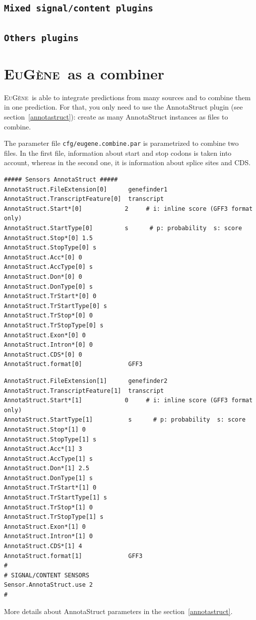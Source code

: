 \documentclass[a4paper,titlepage]{report}
\newcommand{\EuGene}{\textsc{EuG\`ene}}
\begin{document}
\subsection{\texttt{Mixed signal/content plugins}}




\subsection{\texttt{Others plugins}}





\section{\EuGene\ as a combiner}

\EuGene\ is able to integrate predictions from many sources and to combine them in one prediction.
For that, you only need to use the AnnotaStruct plugin (see section~\ref{annotastruct}): create as many AnnotaStruct instances as files to combine.


The parameter file \texttt{cfg/eugene.combine.par} is parametrized to combine two files. 
In the first file, information about start and stop codons is taken into account, whereas in the second one, it is information about splice sites and CDS.
\begin{Verbatim}[fontsize=\small]
 ##### Sensors AnnotaStruct #####
AnnotaStruct.FileExtension[0]      genefinder1
AnnotaStruct.TranscriptFeature[0]  transcript
AnnotaStruct.Start*[0]            2     # i: inline score (GFF3 format only) 
AnnotaStruct.StartType[0]         s      # p: probability  s: score
AnnotaStruct.Stop*[0] 1.5
AnnotaStruct.StopType[0] s
AnnotaStruct.Acc*[0] 0
AnnotaStruct.AccType[0] s
AnnotaStruct.Don*[0] 0
AnnotaStruct.DonType[0] s
AnnotaStruct.TrStart*[0] 0
AnnotaStruct.TrStartType[0] s
AnnotaStruct.TrStop*[0] 0
AnnotaStruct.TrStopType[0] s
AnnotaStruct.Exon*[0] 0
AnnotaStruct.Intron*[0] 0
AnnotaStruct.CDS*[0] 0
AnnotaStruct.format[0]             GFF3
\end{Verbatim}

\begin{Verbatim}[fontsize=\small]
AnnotaStruct.FileExtension[1]      genefinder2
AnnotaStruct.TranscriptFeature[1]  transcript
AnnotaStruct.Start*[1]            0     # i: inline score (GFF3 format only)
AnnotaStruct.StartType[1]          s      # p: probability  s: score
AnnotaStruct.Stop*[1] 0
AnnotaStruct.StopType[1] s
AnnotaStruct.Acc*[1] 3
AnnotaStruct.AccType[1] s
AnnotaStruct.Don*[1] 2.5
AnnotaStruct.DonType[1] s
AnnotaStruct.TrStart*[1] 0
AnnotaStruct.TrStartType[1] s
AnnotaStruct.TrStop*[1] 0
AnnotaStruct.TrStopType[1] s
AnnotaStruct.Exon*[1] 0
AnnotaStruct.Intron*[1] 0
AnnotaStruct.CDS*[1] 4
AnnotaStruct.format[1]             GFF3
#
# SIGNAL/CONTENT SENSORS
Sensor.AnnotaStruct.use 2
#
\end{Verbatim}
More details about AnnotaStruct parameters in the section~\ref{annotastruct}.
\end{document}
